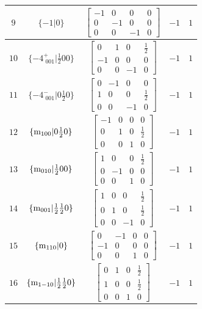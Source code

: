 \documentclass[fleqn,8pt]{jsarticle}
\begin{document}
\begin{longtable}{ccccc}
$ 9 $ & $ \{-1|0\} $ & $ \begin{bmatrix} -1 & 0 & 0 & 0 \\ 0 & -1 & 0 & 0 \\ 0 & 0 & -1 & 0 \end{bmatrix} $ & $ -1 $ & $ 1 $ \\ \hline
$ 10 $ & $ \{-4^{+}_{\,\,001}|\frac{1}{2} 0 0\} $ & $ \begin{bmatrix} 0 & 1 & 0 & \frac{1}{2} \\ -1 & 0 & 0 & 0 \\ 0 & 0 & -1 & 0 \end{bmatrix} $ & $ -1 $ & $ 1 $ \\ \hline
$ 11 $ & $ \{-4^{-}_{\,\,001}|0 \frac{1}{2} 0\} $ & $ \begin{bmatrix} 0 & -1 & 0 & 0 \\ 1 & 0 & 0 & \frac{1}{2} \\ 0 & 0 & -1 & 0 \end{bmatrix} $ & $ -1 $ & $ 1 $ \\ \hline
$ 12 $ & $ \{{\rm m}_{100}|0 \frac{1}{2} 0\} $ & $ \begin{bmatrix} -1 & 0 & 0 & 0 \\ 0 & 1 & 0 & \frac{1}{2} \\ 0 & 0 & 1 & 0 \end{bmatrix} $ & $ -1 $ & $ 1 $ \\ \hline
$ 13 $ & $ \{{\rm m}_{010}|\frac{1}{2} 0 0\} $ & $ \begin{bmatrix} 1 & 0 & 0 & \frac{1}{2} \\ 0 & -1 & 0 & 0 \\ 0 & 0 & 1 & 0 \end{bmatrix} $ & $ -1 $ & $ 1 $ \\ \hline
$ 14 $ & $ \{{\rm m}_{001}|\frac{1}{2} \frac{1}{2} 0\} $ & $ \begin{bmatrix} 1 & 0 & 0 & \frac{1}{2} \\ 0 & 1 & 0 & \frac{1}{2} \\ 0 & 0 & -1 & 0 \end{bmatrix} $ & $ -1 $ & $ 1 $ \\ \hline
$ 15 $ & $ \{{\rm m}_{110}|0\} $ & $ \begin{bmatrix} 0 & -1 & 0 & 0 \\ -1 & 0 & 0 & 0 \\ 0 & 0 & 1 & 0 \end{bmatrix} $ & $ -1 $ & $ 1 $ \\ \hline
$ 16 $ & $ \{{\rm m}_{1-10}|\frac{1}{2} \frac{1}{2} 0\} $ & $ \begin{bmatrix} 0 & 1 & 0 & \frac{1}{2} \\ 1 & 0 & 0 & \frac{1}{2} \\ 0 & 0 & 1 & 0 \end{bmatrix} $ & $ -1 $ & $ 1 $ \\ \hline

\end{longtable}
\end{document}
